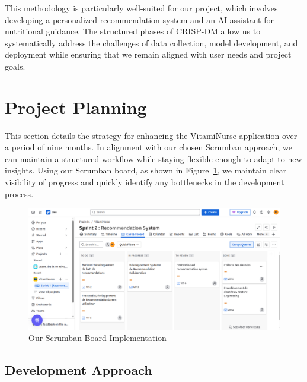 \par This methodology is particularly well-suited for our project, which involves
developing a personalized recommendation system and an AI assistant
for nutritional guidance. The structured phases of CRISP-DM allow
us to systematically address the challenges of data collection, model development, and deployment while ensuring that we remain aligned
with user needs and project goals.



\section{Project Planning}

This section details the strategy for enhancing the VitamiNurse application over a period of nine months. 
In alignment with our chosen Scrumban approach, we can maintain a structured workflow while staying flexible enough to adapt to new insights.
Using our Scrumban board, as shown in Figure~\ref{fig:Tableau_Scrumban}, we maintain clear visibility of progress and quickly identify any bottlenecks in the development process.


\begin{center}
\begin{figure}[H]
            \centering
            \includegraphics[scale=0.55]{images/kanbanBoard.png}
            \caption{Our Scrumban Board Implementation}
            \label{fig:Tableau_Scrumban}
\end{figure}
\end{center}

\subsection{Development Approach}

